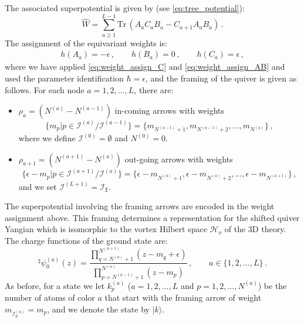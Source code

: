 \documentclass[12pt,a4paper]{article}
\renewcommand{\(}{\left(}
\renewcommand{\)}{\right)}
\renewcommand{\(}{\left(}
\renewcommand{\)}{\right)}
\begin{document}
The associated superpotential is given by (see \eqref{eq:tree_potential}):
{\small
\begin{equation}\label{eq:A_triple_potential}
\widehat{W}=\sum_{a\geq1}^{L-1}\mathrm{Tr}\,(A_aC_aB_a-C_{a+1}A_aB_a)\,.
\end{equation}}
The assignment of the equivariant weights is:
\begin{align}
h(A_a)=-\epsilon\,, \qquad h(B_a)=0\,,\qquad h(C_a)=\epsilon\,,
\end{align}
where we have applied \eqref{eq:weight_assign_C} and \eqref{eq:weight_assign_AB} and used the parameter identification $\hbar=\epsilon$, and the framing of the quiver is given as follows. For each node $a=1,2,\dots,L$, there are:
\begin{itemize}
\item $\rho_a=(N^{(a)}-N^{(a-1)})$ in-coming arrows with weights
\begin{equation}\{m_p|p\in \mathcal{I}^{(a)}/\mathcal{I}^{(a-1)} \}=\{m_{N^{(a-1)}+1},m_{N^{(a-1)}+2},\dots,m_{N^{(a)}}\}\,,\end{equation} where we define $\mathcal{I}^{(0)}=\emptyset$ and $N^{(0)}=0$.
		
\item $\rho_{a+1}=(N^{(a+1)}-N^{(a)})$ out-going arrows with weights
\begin{equation}\{\epsilon-m_p|p\in \mathcal{I}^{(a+1)}/\mathcal{I}^{(a)}\}=\{\epsilon-m_{N^{(a)}+1},\epsilon-m_{N^{(a)}+2},\dots,\epsilon-m_{N^{(a+1)}}\}\,,\end{equation} and we set $\mathcal{I}^{(L+1)}=\mathcal{I}_{\mathtt{f}}$.
\end{itemize}
The superpotential involving the framing arrows are encoded in the weight assignment above. 
This framing determines a representation for the shifted quiver Yangian which is isomorphic to the vortex Hilbert space $\mathcal{H}_\nu$ of the 3D theory. 
The charge functions of the ground state are:
\begin{equation}\label{eq:A_groundstate}
^\sharp\psi^{(a)}_0(z)=\frac{\prod_{q=N^{(a)}+1}^{N^{(a+1)}}(z-m_q+\epsilon)}{\prod_{p=N^{(a-1)}+1}^{N^{(a)}}(z-m_p)}\,,\qquad a\in\{1,2,\dots,L\}\,.
\end{equation}
As before, for a state we let $k^{(a)}_{p}$ ($a=1,2,\dots,L$ and $p=1,2,\dots,N^{(a)}$) be the number of atoms of color $a$ that start with the framing arrow of weight $m_{\mathcal{I}^{(a)}_{p}}=m_{p}$, and we denote the state by $|k\rangle$.
	
\end{document}
